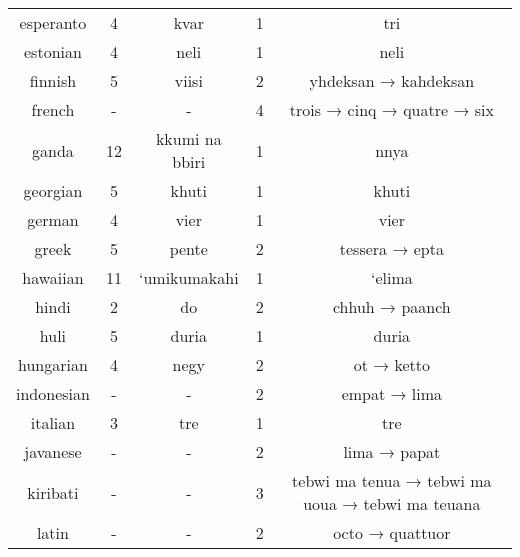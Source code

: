 \begin{landscape}
\begin{longtable}{|c|c|c|c|c|}
    esperanto &   4 &                             kvar &   1 &                                               tri \\
     estonian &   4 &                             neli &   1 &                                              neli \\
      finnish &   5 &                            viisi &   2 &                              yhdeksan → kahdeksan \\
       french &   - &                                - &   4 &                       trois → cinq → quatre → six \\
        ganda &  12 &                   kkumi na bbiri &   1 &                                              nnya \\
     georgian &   5 &                            khuti &   1 &                                             khuti \\
       german &   4 &                             vier &   1 &                                              vier \\
        greek &   5 &                            pente &   2 &                                    tessera → epta \\
     hawaiian &  11 &                     `umikumakahi &   1 &                                            `elima \\
        hindi &   2 &                               do &   2 &                                    chhuh → paanch \\
         huli &   5 &                            duria &   1 &                                             duria \\
    hungarian &   4 &                             negy &   2 &                                        ot → ketto \\
   indonesian &   - &                                - &   2 &                                      empat → lima \\
      italian &   3 &                              tre &   1 &                                               tre \\
     javanese &   - &                                - &   2 &                                      lima → papat \\
     kiribati &   - &                                - &   3 &  tebwi ma tenua → tebwi ma uoua → tebwi ma teuana \\
        latin &   - &                                - &   2 &                                   octo → quattuor \\

\end{longtable}
\end{landscape}
